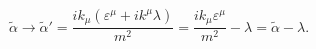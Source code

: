 \begin{equation}
\tilde{\alpha} \rightarrow \tilde{\alpha}'  = \frac{ik_\mu (\varepsilon^\mu + ik^\mu \lambda )}{m^2} =\frac{ik_\mu \varepsilon^\mu}{m^2} - \lambda = \tilde{\alpha} - \lambda  .
\label{62233}
\end{equation}

